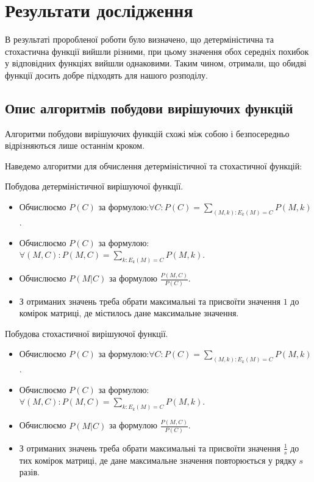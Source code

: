 
\section{Результати дослідження}
\label{chap:research_results} 

В результаті проробленої роботи було визначено, що детерміністична та стохастична функції вийшли різними, при цьому значення обох середніх похибок у відповідних функціях вийшли однаковими. Таким чином, отримали, що обидві функції досить добре підходять для нашого розподілу.

\subsection{Опис алгоритмів побудови вирішуючих функцій}

Алгоритми побудови вирішуючих функцій схожі між собою і безпосередньо відрізняються лише останнім кроком.

Наведемо алгоритми для обчислення детерміністичної та стохастичної функцій:

\begin{algorithm}
    Побудова детерміністичної вирішуючої функції.
    \begin{itemize}
    \large
        \item Обчислюємо $P(C)$ за формулою:$\forall C: P(C) = \sum_{(M,k):E_k(M)=C} P(M,k)$.
        \item Обчислюємо $P(C)$ за формулою: $\forall (M,C): P(M,C) = \sum_{k:E_k(M)=C} P(M,k)$.
        \item Обчислюємо $P(M|C)$ за формулою $\frac{P(M,C)}{P(C)}$.
        \item З отриманих значень треба обрати максимальні та присвоїти значення $1$ до комірок матриці, де містилось дане максимальне значення. 
    \end{itemize}
\end{algorithm}

\begin{algorithm}
    Побудова стохастичної вирішуючої функції.
    \begin{itemize}
    \large
        \item Обчислюємо $P(C)$ за формулою:$\forall C: P(C) = \sum_{(M,k):E_k(M)=C} P(M,k)$.
        \item Обчислюємо $P(C)$ за формулою: $\forall (M,C): P(M,C) = \sum_{k:E_k(M)=C} P(M,k)$.
        \item Обчислюємо $P(M|C)$ за формулою $\frac{P(M,C)}{P(C)}$.
        \item З отриманих значень треба обрати максимальні та присвоїти значення $\frac{1}{s}$ до тих комірок матриці, де дане максимальне значення повторюється у рядку $s$ разів. 
    \end{itemize}
\end{algorithm}

